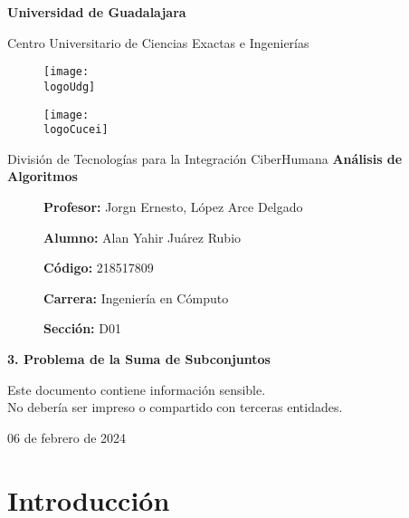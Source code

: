 \documentclass[12pt, a4paper]{article} %
\title{\theTitle}
\author{\theAuthor}
\newcommand{\logoUdg}{../../../../attachments/images/portada-udg.jpeg}
\newcommand{\logoCucei}{../../../../attachments/images/portada-cucei.jpeg}
\newcommand{\materia}{Análisis de Algoritmos}
\newcommand{\theTitle}{3. Problema de la Suma de Subconjuntos}
\newcommand{\profesor}{Jorgn Ernesto, López Arce Delgado}
\newcommand{\theAuthor}{Alan Yahir Juárez Rubio}
\newcommand{\code}{218517809}
\newcommand{\carrera}{Ingeniería en Cómputo}
\newcommand{\seccion}{D01}
\newcommand{\startDate}{06 de febrero de 2024}
\newcommand{\nl}{\par\vspace{0.4cm}}
\begin{document}
\cfoot{\thepage} %

\begin{titlepage}
	\centering
	{\huge\textbf{Universidad de Guadalajara}}\par\vspace{0.6cm}
	{\LARGE{Centro Universitario de Ciencias Exactas e Ingenierías}}\vfill
	
	\begin{figure}[h]
		\begin{minipage}[t]{0.45\textwidth}
			\centering
			\texttt{[image: \\logoUdg]}
		\end{minipage}
		\hfill
		\begin{minipage}[t]{0.45\textwidth}
			\centering
			\texttt{[image: \\logoCucei]}
		\end{minipage}
	\end{figure}\vfill
	
	{\Large{División de Tecnologías para la Integración CiberHumana}}\vfill
	{\Large\textbf{\materia}}\vfill
	\begin{figure}[h]
		\centering
		\begin{minipage}[t]{0.75\textwidth}
			{\Large
				\textbf{Profesor:} \profesor\nl
				\textbf{Alumno:} \theAuthor\nl
				\textbf{Código:} \code\nl
				\textbf{Carrera:} \carrera\nl
				\textbf{Sección:} \seccion
			}
		\end{minipage}
	\end{figure}\vfill
	{\LARGE{\textbf{\theTitle}}}\vfill
	
	\begin{tcolorbox}[colback=red!5!white, colframe=red!75!black]
		\centering
		Este documento contiene información sensible.\\
		No debería ser impreso o compartido con terceras entidades.
	\end{tcolorbox}\vfill
	{\large \startDate}\par
\end{titlepage}

\clearpage
\tableofcontents

	

\clearpage
\section{Introducción}
\end{document}

